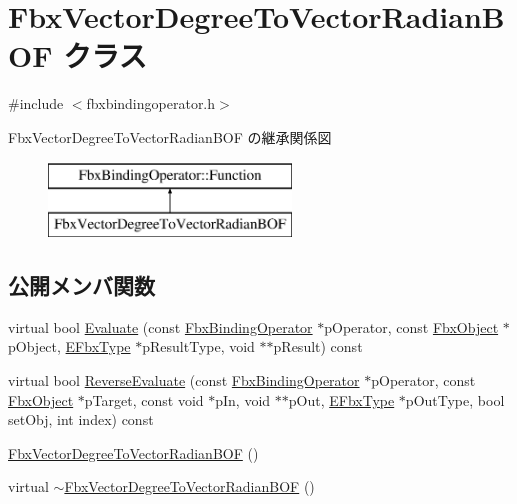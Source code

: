 \hypertarget{class_fbx_vector_degree_to_vector_radian_b_o_f}{}\section{Fbx\+Vector\+Degree\+To\+Vector\+Radian\+B\+OF クラス}
\label{class_fbx_vector_degree_to_vector_radian_b_o_f}


{\ttfamily \#include $<$fbxbindingoperator.\+h$>$}

Fbx\+Vector\+Degree\+To\+Vector\+Radian\+B\+OF の継承関係図\begin{figure}[H]
\begin{center}
\leavevmode
\includegraphics[height=2.000000cm]{class_fbx_vector_degree_to_vector_radian_b_o_f}
\end{center}
\end{figure}
\subsection*{公開メンバ関数}
\begin{DoxyCompactItemize}
\item 
virtual bool \hyperlink{class_fbx_vector_degree_to_vector_radian_b_o_f_a5141b54262a6aad0c2e51ec67367a578}{Evaluate} (const \hyperlink{class_fbx_binding_operator}{Fbx\+Binding\+Operator} $\ast$p\+Operator, const \hyperlink{class_fbx_object}{Fbx\+Object} $\ast$p\+Object, \hyperlink{fbxpropertytypes_8h_a73913a5ddfb20e57c6f25e9e6784bd92}{E\+Fbx\+Type} $\ast$p\+Result\+Type, void $\ast$$\ast$p\+Result) const
\item 
virtual bool \hyperlink{class_fbx_vector_degree_to_vector_radian_b_o_f_a09862a90a073963e88f63afdc60c67c8}{Reverse\+Evaluate} (const \hyperlink{class_fbx_binding_operator}{Fbx\+Binding\+Operator} $\ast$p\+Operator, const \hyperlink{class_fbx_object}{Fbx\+Object} $\ast$p\+Target, const void $\ast$p\+In, void $\ast$$\ast$p\+Out, \hyperlink{fbxpropertytypes_8h_a73913a5ddfb20e57c6f25e9e6784bd92}{E\+Fbx\+Type} $\ast$p\+Out\+Type, bool set\+Obj, int index) const
\item 
\hyperlink{class_fbx_vector_degree_to_vector_radian_b_o_f_a912062f52f69aa6a232ffc9579e49088}{Fbx\+Vector\+Degree\+To\+Vector\+Radian\+B\+OF} ()
\item 
virtual \hyperlink{class_fbx_vector_degree_to_vector_radian_b_o_f_aa10f7c14be5f0685162273cd6d7ad273}{$\sim$\+Fbx\+Vector\+Degree\+To\+Vector\+Radian\+B\+OF} ()
\end{DoxyCompactItemize}
